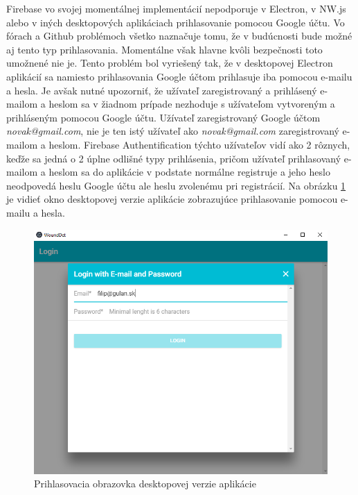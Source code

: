 Firebase vo svojej momentálnej implementácií nepodporuje v Electron, v NW.js alebo v iných desktopových aplikáciach prihlasovanie pomocou Google účtu. Vo fórach a Github problémoch všetko naznačuje tomu, že v budúcnosti bude možné aj tento typ prihlasovania. Momentálne však hlavne kvôli bezpečnosti toto umožnené nie je. Tento problém bol vyriešený tak, že v desktopovej Electron aplikácií sa namiesto prihlasovania Google účtom prihlasuje iba pomocou e-mailu a hesla. Je avšak nutné upozorniť, že užívateľ zaregistrovaný a prihlásený e-mailom a heslom sa v žiadnom prípade nezhoduje s užívateľom vytvoreným a prihláseným pomocou Google účtu. Užívateľ zaregistrovaný Google účtom \textit{novak@gmail.com}, nie je ten istý užívateľ ako \textit{novak@gmail.com} zaregistrovaný e-mailom a heslom. Firebase Authentification týchto užívateľov vidí ako 2 rôznych, keďže sa jedná o 2 úplne odlišné typy prihlásenia, pričom užívateľ prihlasovaný e-mailom a heslom sa do aplikácie v podstate normálne registruje a jeho heslo neodpovedá heslu Google účtu ale heslu zvolenému pri registrácií. Na obrázku \ref{fig:electron-app} je vidieť okno desktopovej verzie aplikácie zobrazujúce prihlasovanie pomocou e-mailu a hesla.
\begin{figure}[h]
  \centering
  \includegraphics[scale=0.45]{fig/electron.png}
  \caption{Prihlasovacia obrazovka desktopovej verzie aplikácie}
  \label{fig:electron-app}
\end{figure}

